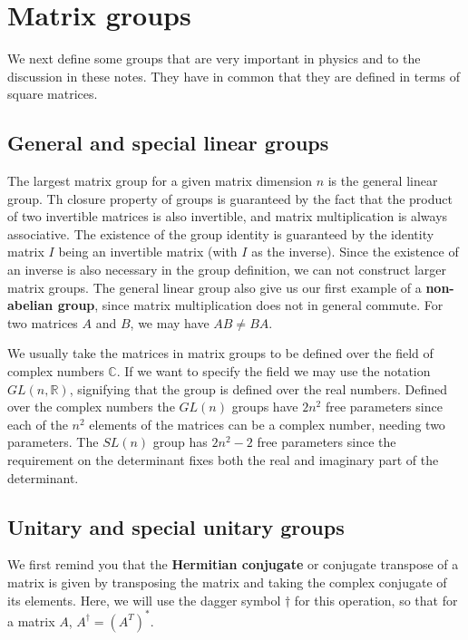 \documentclass[notes.tex]{subfiles}
\begin{document}
\section{Matrix groups}
\label{sec:matrix_groups}
We next define some groups that are very important in physics and to the discussion in these notes. They have in common that they are defined in terms of square matrices.

\subsection{General and special linear groups}
The largest matrix group for a given matrix dimension $n$ is the general linear group.
Th closure property of groups is guaranteed by the fact that the product of two invertible matrices is also invertible, and matrix multiplication is always associative.
The existence of the group identity is guaranteed by the identity matrix $I$ being an invertible matrix (with $I$ as the inverse). Since the existence of an inverse is also necessary in the group definition, we can not construct larger matrix groups. The general linear group also give us our first example of a {\bf non-abelian group}, since matrix multiplication does not in general commute. For two matrices $A$ and $B$, we may have $AB\ne BA$.

We usually take the matrices in matrix groups to be defined over the field of complex numbers $\mathbb{C}$. If we want to specify the field we may use the notation $GL(n, \mathbb{R})$, signifying that the group is defined over the real numbers. Defined over the complex numbers the $GL(n)$ groups have $2n^2$ free parameters since each of the $n^2$ elements of the matrices can be a complex number, needing two parameters. The $SL(n)$ group has $2n^2-2$ free parameters since the requirement on the determinant fixes both the real and imaginary part of the determinant.

\subsection{Unitary and special unitary groups}
We first remind you that the {\bf Hermitian conjugate} or conjugate transpose of a matrix is given by transposing the matrix and taking the complex conjugate of its elements. Here, we will use the dagger symbol $\dagger$ for this operation, so that for a matrix $A$, $A^\dagger=(A^T)^*$.
\end{document}
